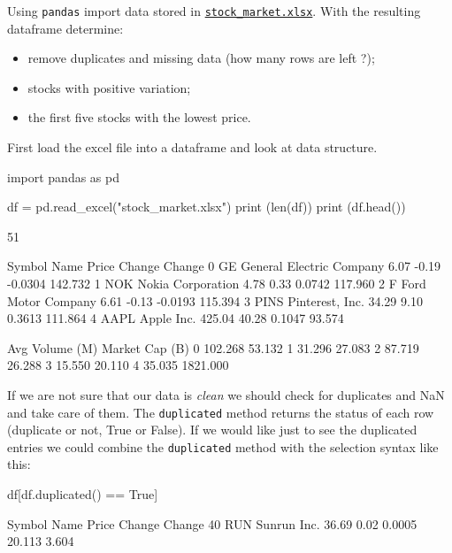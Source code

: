 \begin{question}
Using \texttt{pandas} import data stored in \href{https://drive.google.com/file/d/1Uu9lQorvzM-1xwRKPNszaSqlCYAiY-gr/view?usp=sharing}{\texttt{stock\_market.xlsx}}. With the resulting dataframe determine:
\begin{itemize}
\item remove duplicates and missing data (how many rows are left ?);
\item stocks with positive variation;
\item the first five stocks with the lowest price.
\end{itemize}
\end{question}

\cprotEnv\begin{solution}
First load the excel file into a dataframe and look at data structure.

\begin{ipython}
import pandas as pd

df = pd.read_excel("stock_market.xlsx")
print (len(df))
print (df.head())
\end{ipython}
\begin{ioutput}
51

  Symbol                      Name   Price  Change  Change%
0     GE  General Electric Company    6.07   -0.19  -0.0304     142.732
1    NOK         Nokia Corporation    4.78    0.33   0.0742     117.960
2      F        Ford Motor Company    6.61   -0.13  -0.0193     115.394
3   PINS           Pinterest, Inc.   34.29    9.10   0.3613     111.864
4   AAPL                Apple Inc.  425.04   40.28   0.1047      93.574

   Avg Volume (M)  Market Cap (B)
0         102.268          53.132
1          31.296          27.083
2          87.719          26.288
3          15.550          20.110
4          35.035        1821.000
\end{ioutput}
        
If we are not sure that our data is \emph{clean} we should check for duplicates and NaN and take care of them. The \texttt{duplicated} method returns the status of each row (duplicate or not, True or False). If we would like just to see the duplicated entries we could combine the \texttt{duplicated} method with the selection syntax like this:

\begin{ipython}
df[df.duplicated() == True]

   Symbol         Name  Price  Change  Change%
40    RUN  Sunrun Inc.  36.69    0.02   0.0005      20.113           3.604


\end{ipython}
\end{solution}
